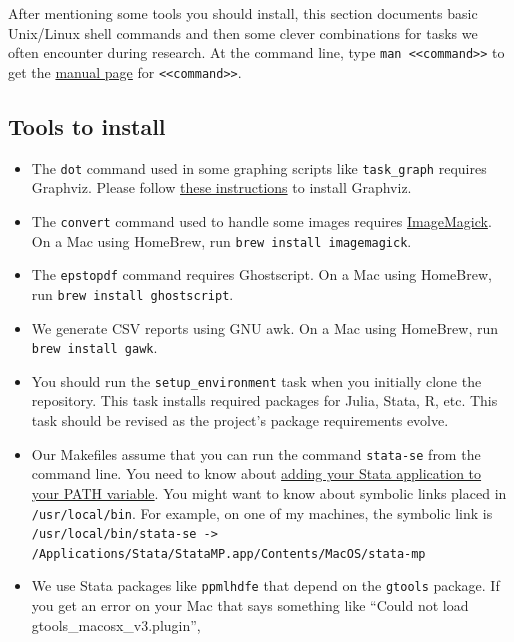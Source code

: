 \label{entry:unixshelltips}

After mentioning some tools you should install,
this section documents basic Unix/Linux shell commands and then some clever combinations for tasks we often encounter during research.
At the command line, type \texttt{man <<command>>} to get the \href{https://en.wikipedia.org/wiki/Man_page}{manual page} for \texttt{<<command>>}.

\subsection{Tools to install}
\begin{itemize}
\item
The \texttt{dot} command used in some graphing scripts like \texttt{task\_graph} requires Graphviz.
Please follow \href{https://graphviz.org/download/}{these instructions} to install Graphviz.
\item
The \texttt{convert} command used to handle some images requires \href{https://imagemagick.org/index.php}{ImageMagick}.
On a Mac using HomeBrew, run \texttt{brew install imagemagick}.
\item 
The \texttt{epstopdf} command requires Ghostscript.
On a Mac using HomeBrew, run \texttt{brew install ghostscript}.
\item 
We generate CSV reports using GNU awk.
On a Mac using HomeBrew, run \texttt{brew install gawk}.
\item
You should run the \texttt{setup\_environment} task when you initially clone the repository.
This task installs required packages for Julia, Stata, R, etc.
This task should be revised as the project's package requirements evolve.
\item
Our Makefiles assume that you can run the command \texttt{stata-se} from the command line. 
You need to know about \href{https://www.stata.com/support/faqs/mac/advanced-topics/}{adding your Stata application to your PATH variable}.
You might want to know about symbolic links placed in \texttt{/usr/local/bin}.
For example, on one of my machines, the symbolic link is
\texttt{/usr/local/bin/stata-se -> /Applications/Stata/StataMP.app/Contents/MacOS/stata-mp}
\item
We use Stata packages like \texttt{ppmlhdfe} that depend on the \texttt{gtools} package.
If you get an error on your Mac that says something like ``Could not load gtools\_macosx\_v3.plugin'',

\end{itemize}
